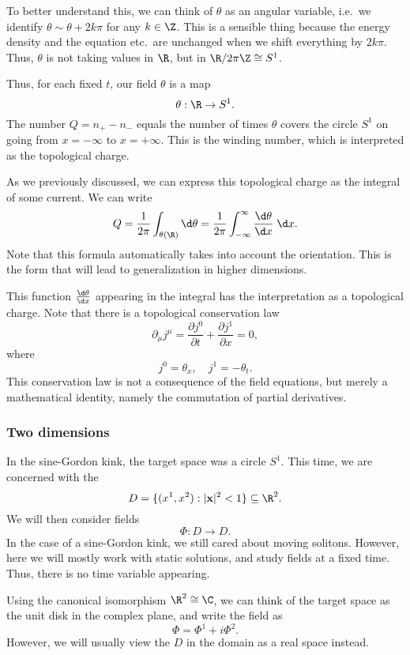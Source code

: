 \documentclass[a4paper]{article}
\begin{document}
To better understand this, we can think of $\theta$ as an angular variable, i.e.\ we identify $\theta \sim \theta + 2k\pi$ for any $k \in \Z$. This is a sensible thing because the energy density and the equation etc.\ are unchanged when we shift everything by $2k\pi$. Thus, $\theta$ is not taking values in $\R$, but in $\R/2\pi\Z \cong S^1$.

Thus, for each fixed $t$, our field $\theta$ is a map
\[
  \theta: \R \to S^1.
\]
The number $Q = n_+ - n_-$ equals the number of times $\theta$ covers the circle $S^1$ on going from $x = -\infty$ to $x = +\infty$. This is the winding number, which is interpreted as the topological charge.

As we previously discussed, we can express this topological charge as the integral of some current. We can write
\[
  Q = \frac{1}{2\pi} \int_{\theta(\R)} \d \theta = \frac{1}{2\pi} \int_{-\infty}^\infty \frac{\d \theta}{\d x}\;\d x.
\]
Note that this formula automatically takes into account the orientation. This is the form that will lead to generalization in higher dimensions.

This function $\frac{\d \theta}{\d x}$ appearing in the integral has the interpretation as a topological charge. Note that there is a topological conservation law
\[
  \partial_\mu j^\mu = \frac{\partial j^0}{\partial t} + \frac{\partial j^1}{\partial x} = 0,
\]
where
\[
  j^0 = \theta_x,\quad j^1 = -\theta_t.
\]
This conservation law is not a consequence of the field equations, but merely a mathematical identity, namely the commutation of partial derivatives.

\subsubsection*{Two dimensions}
In the sine-Gordon kink, the target space was a circle $S^1$. This time, we are concerned with the 
\[
  D = \{(x^1, x^2): |\mathbf{x}|^2 < 1\} \subseteq \R^2.
\]
We will then consider fields
\[
  \Phi: D \to D.
\]
In the case of a sine-Gordon kink, we still cared about moving solitons. However, here we will mostly work with static solutions, and study fields at a fixed time. Thus, there is no time variable appearing.

Using the canonical isomorphism $\R^2 \cong \C$, we can think of the target space as the unit disk in the complex plane, and write the field as
\[
  \Phi = \Phi^1 + i \Phi^2.
\]
However, we will usually view the $D$ in the domain as a real space instead.
\end{document}
